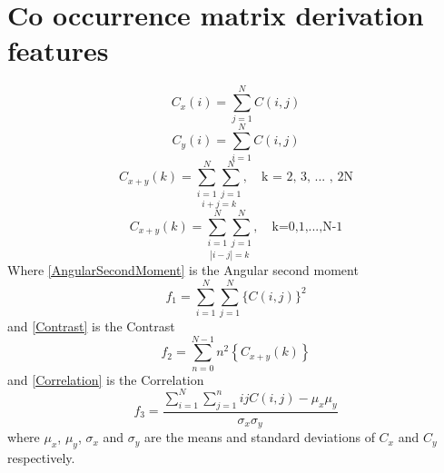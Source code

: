 \chapter{Co occurrence matrix derivation features}
\label{derivationfeatures}
\begin{equation}\label{Cxi}
  C_x(i) = \sum_{j=1}^{N}C(i,j)
\end{equation}
\begin{equation}\label{Cyi}
  C_y(i) = \sum_{i=1}^{N}C(i,j)
\end{equation}
\begin{equation}\label{Cxplusy}
  C_{x+y}(k) = \underset{i+j=k}{\sum_{i=1}^{N}\sum_{j=1}^{N}}, \quad \text{k = 2, 3, ... , 2N}
\end{equation}
\begin{equation}\label{Cxminusy}
  C_{x+y}(k) = \underset{|i-j|=k}{\sum_{i=1}^{N}\sum_{j=1}^{N}}, \quad \text{k=0,1,...,N-1}
\end{equation}
Where \ref{AngularSecondMoment} is the Angular second moment
\begin{equation}\label{AngularSecondMoment}
  f_1 = \sum_{i=1}^{N}\sum_{j=1}^{N}\{C(i,j)\}^2
\end{equation}
and \ref{Contrast} is the Contrast
\begin{equation}\label{Contrast}
  f_2 = \sum_{n=0}^{N-1} n^2 \left\{C_{x+y}(k)\right\}
\end{equation}
and \ref{Correlation} is the Correlation
\begin{equation}\label{Correlation}
  f_3 = \frac{\sum_{i=1}^{N}\sum_{j=1}^{n} i j C(i,j) - \mu_x \mu_y}{\sigma_x\sigma_y}
\end{equation}
where $\mu_x$, $\mu_y$, $\sigma_x$ and $\sigma_y$ are the means and standard deviations of $C_x$ and $C_y$ respectively.

